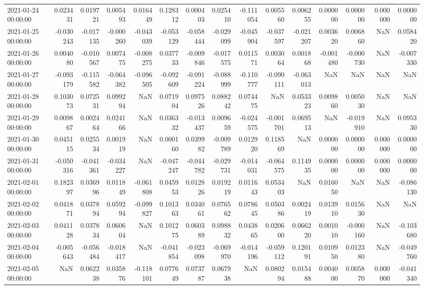 \begin{tabular}{lrrrrrrrrrrrrrr}
2021-01-24 00:00:00 & 0.023431 & 0.019721 & 0.005493 & 0.016449 & 0.128312 & 0.000403 & 0.025410 & -0.111054 & 0.005560 & 0.006255 & 0.000000 & 0.000000 & 0.000000 & 0.000000 \\
2021-01-25 00:00:00 & -0.030243 & -0.017135 & -0.000260 & -0.043039 & -0.053129 & -0.058444 & -0.029099 & -0.045904 & -0.037597 & -0.021207 & 0.003620 & 0.006860 & NaN & 0.058420 \\
2021-01-26 00:00:00 & 0.004080 & -0.010567 & 0.007475 & -0.008275 & 0.037733 & -0.009846 & -0.017575 & 0.011571 & 0.003064 & 0.001868 & -0.001480 & -0.000730 & NaN & -0.007330 \\
2021-01-27 00:00:00 & -0.093179 & -0.115582 & -0.064382 & -0.096505 & -0.092609 & -0.091224 & -0.088999 & -0.110777 & -0.090111 & -0.063013 & NaN & NaN & NaN & NaN \\
2021-01-28 00:00:00 & 0.103073 & 0.072531 & 0.099294 & NaN & 0.071904 & 0.097526 & 0.088242 & 0.074475 & NaN & 0.053323 & 0.009860 & 0.005030 & NaN & NaN \\
2021-01-29 00:00:00 & 0.009867 & 0.002464 & 0.024166 & NaN & 0.036332 & -0.013437 & 0.009659 & -0.024575 & -0.001701 & 0.069513 & NaN & -0.019910 & NaN & 0.095330 \\
2021-01-30 00:00:00 & 0.045115 & 0.025534 & 0.001919 & NaN & 0.000160 & 0.039982 & -0.009789 & 0.012920 & 0.118569 & NaN & 0.000000 & 0.000000 & 0.000000 & 0.000000 \\
2021-01-31 00:00:00 & -0.050316 & -0.041361 & -0.034227 & NaN & -0.047247 & -0.044782 & -0.029731 & -0.014031 & -0.064575 & 0.114935 & 0.000000 & 0.000000 & 0.000000 & 0.000000 \\
2021-02-01 00:00:00 & 0.182397 & 0.036996 & 0.011849 & -0.061808 & 0.045953 & 0.012826 & 0.019219 & 0.011643 & 0.053403 & NaN & 0.016050 & NaN & NaN & -0.086130 \\
2021-02-02 00:00:00 & 0.041871 & 0.037894 & 0.059294 & -0.099827 & 0.101363 & 0.034061 & 0.076562 & 0.078645 & 0.050386 & 0.002419 & 0.013910 & 0.015630 & NaN & NaN \\
2021-02-03 00:00:00 & 0.041128 & 0.037834 & 0.060604 & NaN & 0.101275 & 0.060389 & 0.098832 & 0.043865 & 0.020600 & 0.066220 & 0.001010 & -0.000160 & NaN & -0.103680 \\
2021-02-04 00:00:00 & -0.005643 & -0.056484 & -0.018417 & NaN & -0.041854 & -0.023098 & -0.069970 & -0.014196 & -0.059112 & 0.120191 & 0.010950 & 0.012380 & NaN & -0.049760 \\
2021-02-05 00:00:00 & NaN & 0.062238 & 0.035876 & -0.118101 & 0.077649 & 0.073787 & 0.067938 & NaN & 0.080294 & 0.015488 & 0.004000 & 0.005870 & 0.000000 & -0.041340 \\

\end{tabular}
